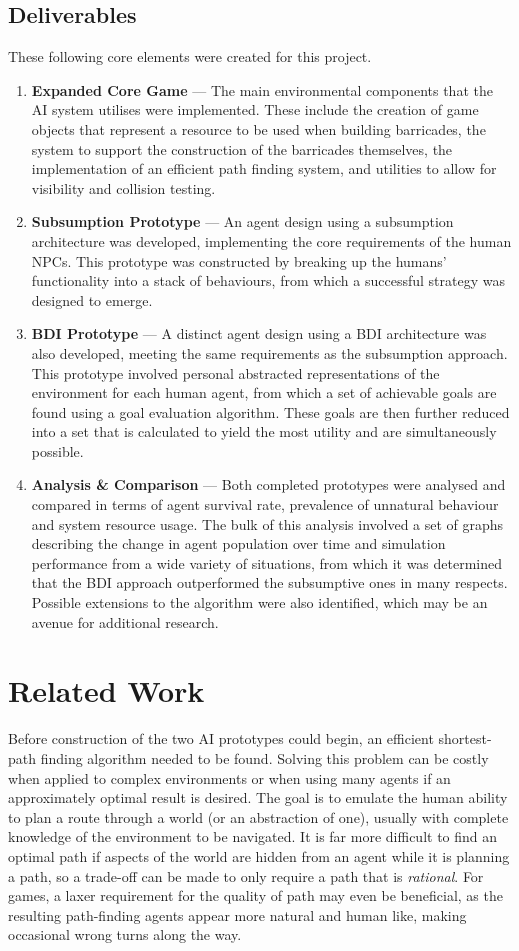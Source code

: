 \documentclass[a4paper,12pt]{article}
\newcommand{\deliverable}[2]{\item \textbf{#1} --- #2}
\begin{document}
\subsection{Deliverables}\noindent
These following core elements were created for this project.

\begin{enumerate}
  \deliverable{Expanded Core Game}
  {The main environmental components that the AI system utilises were implemented. These include the creation of game objects that represent a resource to be used when building barricades, the system to support the construction of the barricades themselves, the implementation of an efficient path finding system, and utilities to allow for visibility and collision testing.}

  \deliverable{Subsumption Prototype}
  {An agent design using a subsumption architecture was developed, implementing the core requirements of the human NPCs. This prototype was constructed by breaking up the humans' functionality into a stack of behaviours, from which a successful strategy was designed to emerge.}

  \deliverable{BDI Prototype}
  {A distinct agent design using a BDI architecture was also developed, meeting the same requirements as the subsumption approach. This prototype involved personal abstracted representations of the environment for each human agent, from which a set of achievable goals are found using a goal evaluation algorithm. These goals are then further reduced into a set that is calculated to yield the most utility and are simultaneously possible.}

  \deliverable{Analysis \& Comparison}
  {Both completed prototypes were analysed and compared in terms of agent survival rate, prevalence of unnatural behaviour and system resource usage. The bulk of this analysis involved a set of graphs describing the change in agent population over time and simulation performance from a wide variety of situations, from which it was determined that the BDI approach outperformed the subsumptive ones in many respects. Possible extensions to the algorithm were also identified, which may be an avenue for additional research.}
\end{enumerate}

\section{Related Work}
Before construction of the two AI prototypes could begin, an efficient shortest-path finding algorithm needed to be found. Solving this problem can be costly when applied to complex environments or when using many agents if an approximately optimal result is desired. The goal is to emulate the human ability to plan a route through a world (or an abstraction of one), usually with complete knowledge of the environment to be navigated. It is far more difficult to find an optimal path if aspects of the world are hidden from an agent while it is planning a path, so a trade-off can be made to only require a path that is \emph{rational}. For games, a laxer requirement for the quality of path may even be beneficial, as the resulting path-finding agents appear more natural and human like, making occasional wrong turns along the way.
\end{document}
